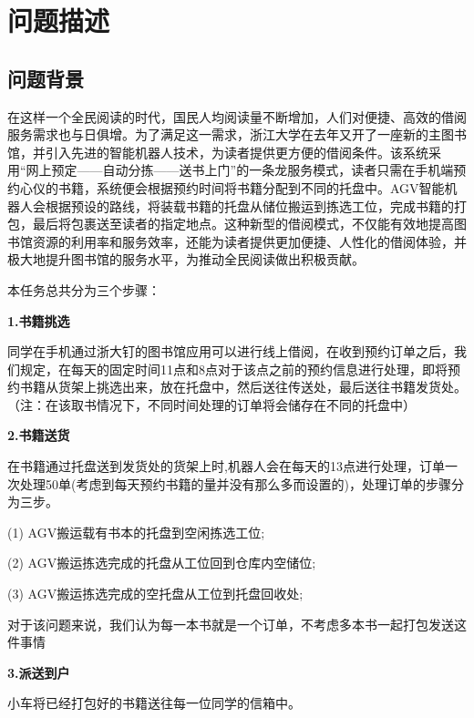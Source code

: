 \documentclass[withoutpreface,bwprint]{thesis-config}
\begin{document}
\section{问题描述}
\subsection{问题背景}
\par 在这样一个全民阅读的时代，国民人均阅读量不断增加，人们对便捷、高效的借阅服务需求也与日俱增。为了满足这一需求，浙江大学在去年又开了一座新的主图书馆，并引入先进的智能机器人技术，为读者提供更方便的借阅条件。该系统采用“网上预定——自动分拣——送书上门”的一条龙服务模式，读者只需在手机端预约心仪的书籍，系统便会根据预约时间将书籍分配到不同的托盘中。AGV智能机器人会根据预设的路线，将装载书籍的托盘从储位搬运到拣选工位，完成书籍的打包，最后将包裹送至读者的指定地点。这种新型的借阅模式，不仅能有效地提高图书馆资源的利用率和服务效率，还能为读者提供更加便捷、人性化的借阅体验，并极大地提升图书馆的服务水平，为推动全民阅读做出积极贡献。
\par 本任务总共分为三个步骤：
\par \textbf{1.书籍挑选}
\par 同学在手机通过浙大钉的图书馆应用可以进行线上借阅，在收到预约订单之后，我们规定，在每天的固定时间11点和8点对于该点之前的预约信息进行处理，即将预约书籍从货架上挑选出来，放在托盘中，然后送往传送处，最后送往书籍发货处。（注：在该取书情况下，不同时间处理的订单将会储存在不同的托盘中）
\par \textbf{2.书籍送货}
\par 在书籍通过托盘送到发货处的货架上时,机器人会在每天的13点进行处理，订单一次处理50单(考虑到每天预约书籍的量并没有那么多而设置的)，处理订单的步骤分为三步。
\par \quad (1) AGV搬运载有书本的托盘到空闲拣选工位;
\par \quad (2) AGV搬运拣选完成的托盘从工位回到仓库内空储位;
\par \quad (3) AGV搬运拣选完成的空托盘从工位到托盘回收处;
\par 对于该问题来说，我们认为每一本书就是一个订单，不考虑多本书一起打包发送这件事情
\par \textbf{3.派送到户}
\par 小车将已经打包好的书籍送往每一位同学的信箱中。
\end{document}
